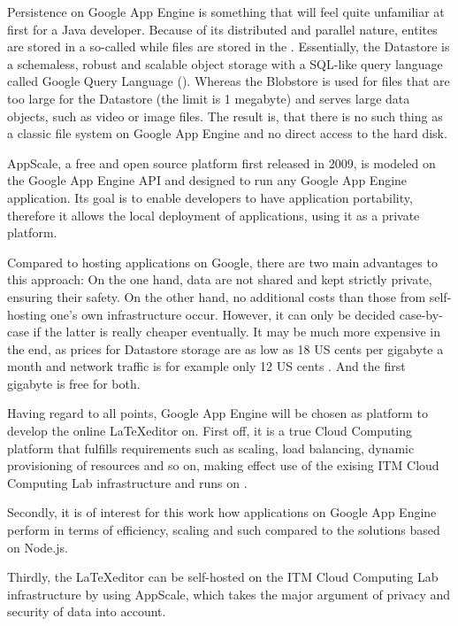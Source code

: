 Persistence on Google App Engine is something that will feel quite unfamiliar at first for a Java developer. Because of its distributed and parallel nature, entites are stored in a so-called  while files are stored in the . Essentially, the Datastore is a schemaless, robust and scalable object storage with a SQL-like query language called Google Query Language (). Whereas the Blobstore is used for files that are too large for the Datastore (the limit is 1 megabyte) and serves large data objects, such as video or image files. The result is, that there is no such thing as a classic file system on Google App Engine and no direct access to the hard disk.

AppScale, a free and open source platform first released in 2009, is modeled on the Google App Engine API and designed to run any Google App Engine application. Its goal is to enable developers to have application portability, therefore it allows the local deployment of applications, using it as a private platform. 

\pagebreak

Compared to hosting applications on Google, there are two main advantages to this approach: On the one hand, data are not shared and kept strictly private, ensuring their safety. On the other hand, no additional costs than those from self-hosting one's own infrastructure occur. However, it can only be decided case-by-case if the latter is really cheaper eventually. It may be much more expensive in the end, as prices for Datastore storage are as low as 18 US cents per gigabyte a month and network traffic is for example only 12 US cents \cite{website:appengine-pricing}. And the first gigabyte is free for both.

Having regard to all points, Google App Engine will be chosen as platform to develop the online \LaTeX editor on. First off, it is a true Cloud Computing platform that fulfills requirements such as scaling, load balancing, dynamic provisioning of resources and so on, making effect use of the exising ITM Cloud Computing Lab infrastructure and runs on . 

Secondly, it is of interest for this work how applications on Google App Engine perform in terms of efficiency, scaling and such compared to the solutions based on Node.js.

Thirdly, the \LaTeX editor can be self-hosted on the ITM Cloud Computing Lab infrastructure by using AppScale, which takes the major argument of privacy and security of data into account. 

